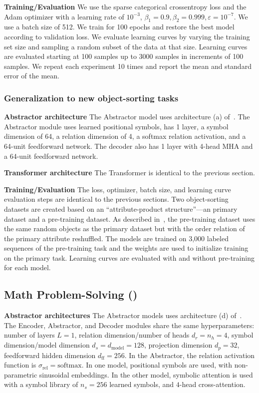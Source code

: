 \textbf{Training/Evaluation} We use the sparse categorical crossentropy loss and the Adam optimizer with a learning rate of $10^{-3}$, $\beta_1 = 0.9, \beta_2 = 0.999, \varepsilon = 10^{-7}$. We use a batch size of 512. We train for 100 epochs and restore the best model according to validation loss. We evaluate learning curves by varying the training set size and sampling a random subset of the data at that size. Learning curves are evaluated starting at 100 samples up to 3000 samples in increments of 100 samples. We repeat each experiment 10 times and report the mean and standard error of the mean.

\subsubsection{Generalization to new object-sorting tasks}

\textbf{Abstractor architecture} The Abstractor model uses architecture (a) of~. The Abstractor module uses learned positional symbols, has 1 layer, a symbol dimension of 64, a relation dimension of 4, a softmax relation activation, and a 64-unit feedforward network.  The decoder also has 1 layer with 4-head MHA and a 64-unit feedforward network.

\textbf{Transformer architecture} The Transformer is identical to the previous section.

\textbf{Training/Evaluation} The loss, optimizer, batch size, and learning curve evaluation steps are identical to the previous sections. Two object-sorting datasets are created based on an ``attribute-product structure''---an primary dataset and a pre-training dataset. As described in~, the pre-training dataset uses the same random objects as the primary dataset but with the order relation of the primary attribute reshuffled. The models are trained on 3,000 labeled sequences of the pre-training task and the weights are used to initialize training on the primary task. Learning curves are evaluated with and without pre-training for each model.

\subsection{Math Problem-Solving ()}

\textbf{Abstractor architectures} The Abstractor models uses architecture (d) of~. The Encoder, Abstractor, and Decoder modules share the same hyperparameters: number of layers $L = 1$, relation dimension/number of heads $d_r = n_h = 4$, symbol dimension/model dimension $d_s = d_{\mathrm{model}} = 128$, projection dimension $d_p = 32$, feedforward hidden dimension $d_{\mathrm{ff}} = 256$. In the Abstractor, the relation activation function is $\sigma_{\mathrm{rel}} = \mathrm{softmax}$. In one model, positional symbols are used, with non-parametric sinusoidal embeddings. In the other model, symbolic attention is used with a symbol library of $n_s = 256$ learned symbols, and $4$-head cross-attention.

